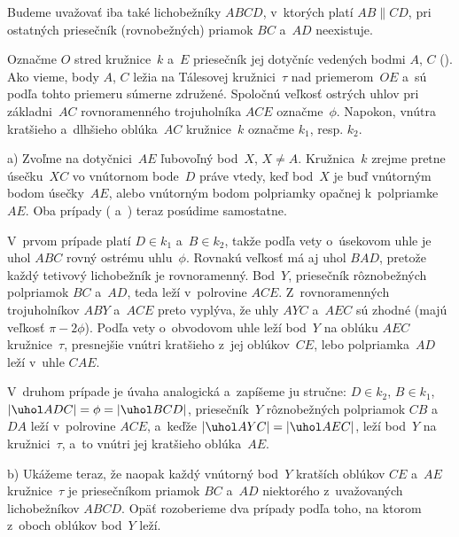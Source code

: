 {%
Budeme uvažovať iba také lichobežníky $ABCD$, v~ktorých
platí ${AB\parallel CD}$, pri ostatných priesečník (rovnobežných)
priamok $BC$ a~$AD$ neexistuje.

Označme $O$ stred kružnice~$k$ a~$E$ priesečník jej dotyčníc
vedených bodmi $A$, $C$ (\obr).
Ako vieme, body $A$, $C$ ležia na Tálesovej
kružnici~$\tau$ nad priemerom~$OE$ a~sú podľa tohto
priemeru súmerne združené. Spoločnú veľkosť ostrých uhlov
pri základni~$AC$ rovnoramenného trojuholníka $ACE$ označme~$\phi$.
Napokon, vnútra kratšieho a~dlhšieho oblúka~$AC$
kružnice~$k$ označme $k_1$, resp. $k_2$.
%

a) Zvoľme na dotyčnici~$AE$ ľubovoľný bod~$X$, $X\ne A$. Kružnica~$k$
zrejme pretne úsečku~$XC$ vo vnútornom bode~$D$ práve vtedy, keď bod~$X$
je buď vnútorným bodom úsečky~$AE$, alebo vnútorným bodom
polpriamky opačnej k~polpriamke~$AE$.
Oba prípady ( a~\obr) teraz posúdime samostatne.

V~prvom prípade platí $D\in k_1$ a~$B\in k_2$, takže podľa vety
o~úsekovom uhle je uhol $ABC$ rovný ostrému uhlu~$\phi$. Rovnakú veľkosť má aj uhol $BAD$, pretože
každý tetivový lichobežník je rovnoramenný. Bod~$Y$,
priesečník rôznobežných polpriamok $BC$ a~$AD$,
teda leží v~polrovine $ACE$. Z~rovnoramenných trojuholníkov $ABY$ a~$ACE$ preto vyplýva,
že uhly $AYC$ a~$AEC$ sú zhodné (majú veľkosť $\pi-2\phi$).
Podľa vety o~obvodovom uhle leží
bod~$Y$ na oblúku $AEC$ kružnice~$\tau$, presnejšie vnútri
kratšieho z~jej oblúkov~$CE$, lebo polpriamka~$AD$ leží v~uhle $CAE$.

V~druhom prípade je úvaha analogická a~zapíšeme ju stručne:
$D\in k_2$, ${B\in k_1}$, $|\uhol ADC|=\phi=|\uhol BCD|$,
priesečník~$Y$ rôznobežných polpriamok $CB$ a~$DA$ leží
v~polrovine $ACE$, a~keďže
$|\uhol AYC|=|\uhol AEC|$,
leží bod~$Y$ na kružnici~$\tau$, a~to
vnútri jej kratšieho oblúka~$AE$.

b) Ukážeme teraz, že naopak každý vnútorný bod~$Y$ kratších oblúkov
$CE$ a~$AE$ kružnice~$\tau$ je priesečníkom priamok $BC$ a~$AD$
niektorého z~uvažovaných lichobežníkov $ABCD$.
Opäť rozoberieme dva prípady podľa toho,
na ktorom z~oboch oblúkov bod~$Y$ leží.

}
